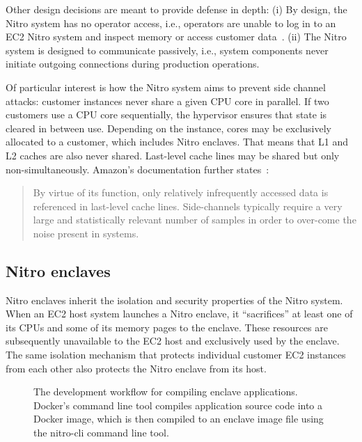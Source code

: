 Other design decisions are meant to provide defense in depth: (i) By
design, the Nitro system has no operator access, i.e., operators are unable to
log in to an EC2 Nitro system and inspect memory or access customer
data~\cite[p.~15]{Bean2022a}. (ii) The Nitro system is designed to communicate
passively, i.e., system components never initiate outgoing connections during
production operations.

Of particular interest is how the Nitro system aims to prevent side channel
attacks: customer instances never share a given CPU core in parallel.  If two
customers use a CPU core sequentially, the hypervisor ensures that state is
cleared in between use.  Depending on the instance, cores may be exclusively
allocated to a customer, which includes Nitro enclaves.  That means that L1 and
L2 caches are also never shared.  Last-level cache lines may be shared but only
non-simultaneously.  Amazon's documentation further
states~\cite[p.~19]{Bean2022a}:

\begin{quote}
By virtue of its function, only relatively infrequently accessed data is
referenced in last-level cache lines.  Side-channels typically require a very
large and statistically relevant number of samples in order to over-come the
noise present in systems.
\end{quote}

\subsection{Nitro enclaves}%
\label{sec:nitro-enclaves}

Nitro enclaves inherit the isolation and security properties of the Nitro
system.  When an EC2 host system launches a Nitro enclave, it ``sacrifices'' at
least one of its CPUs and some of its memory pages to the enclave.  These
resources are subsequently unavailable to the EC2 host and exclusively used by
the enclave.  The same isolation mechanism that protects individual customer EC2
instances from each other also protects the Nitro enclave from its host.

\begin{figure}[t]
  \centering
  
  \caption{The development workflow for compiling enclave applications.
  Docker's command line tool compiles application source code into a Docker
  image, which is then compiled to an enclave image file using the nitro-cli
  command line tool.}\label{fig:dev-workflow}
\end{figure}

